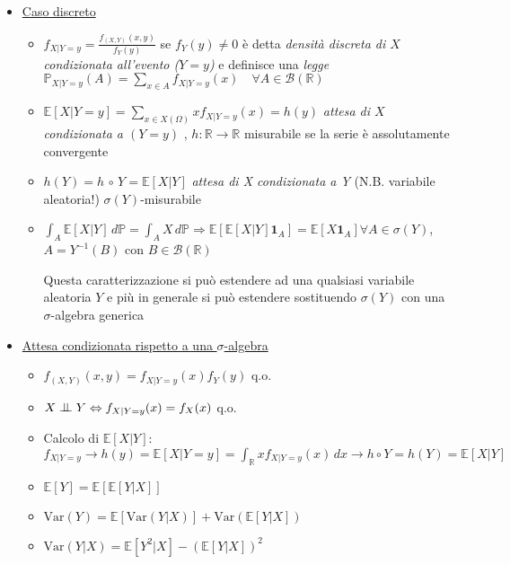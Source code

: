 \documentclass[openany]{book} %
\newcommand{\ind}{\mathrel{\text{\scalebox{1.07}{$\perp\mkern-10mu\perp$}}}}
\begin{document}
\begin{itemize}

	\item \underline{Caso discreto}

	      \begin{itemize}

		      \item $f_{X|Y=y} = \frac{f_(X,Y)(x,y)}{f_Y(y)}$ se $f_Y(y)\neq 0$ è detta \textit{densità discreta di $X$ condizionata all'evento ($Y=y$)} e definisce una \textit{legge} $\mathbb{P}_{X|Y=y}(A) = \displaystyle\sum_{x\in A}f_{X|Y=y}(x) \quad \forall A\in \mathcal{B}(\mathbb{R})$

		      \item $\mathbb{E}[X|Y=y] = \displaystyle\sum_{x\in X(\Omega)}xf_{X|Y=y}(x) = h(y)$ \textit{attesa di $X$ condizionata a $(Y=y)$} , $h: \mathbb{R}\rightarrow \mathbb{R}$ misurabile se la serie è assolutamente convergente

		      \item $h(Y)=h\,\circ\,Y = \mathbb{E}[X|Y]$ \textit{attesa di X condizionata a Y} (N.B. variabile aleatoria!) $\sigma(Y)$-misurabile

		      \item $\int_A \mathbb{E}[X|Y]\,d \mathbb{P} = \int_AX\,d \mathbb{P}\Rightarrow \mathbb{E}[\mathbb{E}[X|Y]\boldsymbol{1}_A] = \mathbb{E}[X \boldsymbol{1}_A]$\quad$\forall A \in \sigma(Y)$, $A=Y^{-1}(B)$ con $B\in \mathcal{B}(\mathbb{R})$

		            Questa caratterizzazione si può estendere ad una qualsiasi variabile aleatoria $Y$ e più in generale si può estendere sostituendo $\sigma(Y)$ con una $\sigma$-algebra generica

	      \end{itemize}

	\item \underline{Attesa condizionata rispetto a una $\sigma$-algebra}

	      \begin{itemize}

		      \item $f_{(X,Y)}(x,y) = f_{X|Y=y}(x)f_Y(y)$ q.o.

		      \item $X\ind Y \Leftrightarrow f_{X|Y=y}(x)=f_X(x)$ q.o.

		      \item Calcolo di $\mathbb{E}[X|Y]$: $f_{X|Y=y}\rightarrow h(y)=\mathbb{E}[X|Y=y] = \int_\mathbb{R}xf_{X|Y=y}(x)\,dx \rightarrow h\circ Y = h(Y)=\mathbb{E}[X|Y]$

		      \item $\mathbb{E}[Y]=\mathbb{E}[\mathbb{E}[Y|X]]$

		      \item $\text{Var}(Y)=\mathbb{E}[\text{Var}(Y|X)] + \text{Var}(\mathbb{E}[Y|X])$

		      \item $\text{Var}(Y|X)=\mathbb{E}[Y^2|X]-(\mathbb{E}[Y|X])^2$

	      \end{itemize}

\end{itemize}
\end{document}
